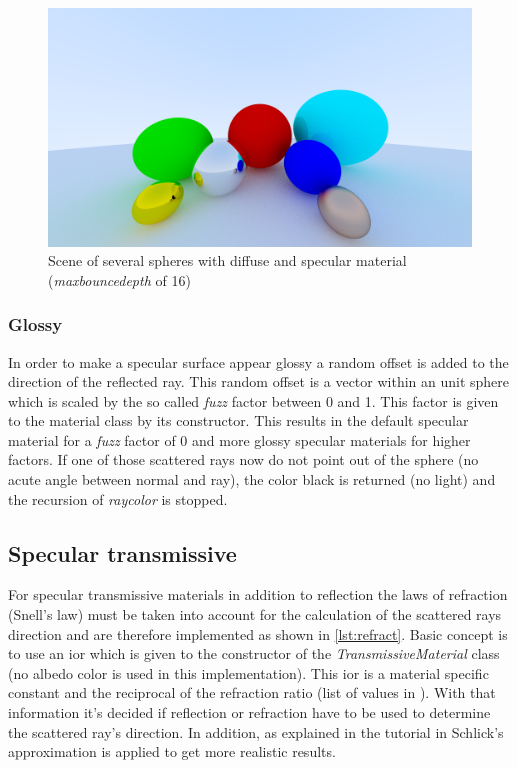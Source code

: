 \documentclass[]{article}
\begin{document}
		\begin{figure}[h]
			\centering
			\includegraphics[width=0.9\linewidth]{image6-5}
			\caption{Scene of several spheres with diffuse and specular material (\emph{max\textunderscore bounce\textunderscore depth} of 16)}
			\label{fig:image6}
		\end{figure}
	
		\subsubsection{Glossy}
		\label{sec:glossy}
		In order to make a specular surface appear glossy a random offset is added to the direction of the reflected ray. This random offset is a vector within an unit sphere which is scaled by the so called \emph{fuzz} factor between 0 and 1. This factor is given to the material class by its constructor. This results in the default specular material for a \emph{fuzz} factor of 0 and more glossy specular materials for higher factors. If one of those scattered rays now do not point out of the sphere (no acute angle between normal and ray), the color black is returned (no light) and the recursion of \emph{ray\textunderscore color} is stopped.
	
		\subsection{Specular transmissive}
		For specular transmissive materials in addition to reflection the laws of refraction (Snell's law) must be taken into account for the calculation of the scattered rays direction and are therefore implemented as shown in \cref{lst:refract}. Basic concept is to use an \ac{ior} which is given to the constructor of the \emph{TransmissiveMaterial} class (no albedo color is used in this implementation). This \ac{ior} is a material specific constant and the reciprocal of the refraction ratio (list of values in \cite{IOR}). With that information it's decided if reflection or refraction have to be used to determine the scattered ray's direction. In addition, as explained in the tutorial in \cite{Shirley2020RTW1} Schlick's approximation is applied to get more realistic results.
		
\end{document}
